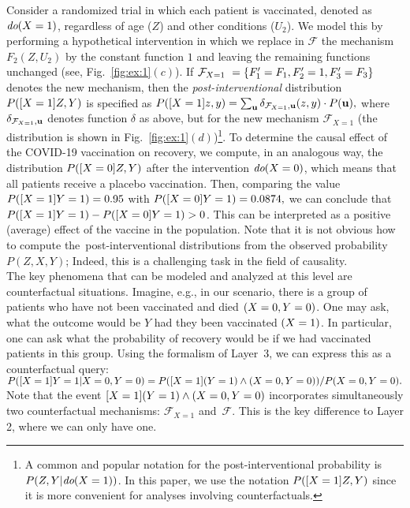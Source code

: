 \documentclass[a4paper,UKenglish,cleveref, autoref, thm-restate]{lipics-v2021}
\newcommand{\compactEquals}[1]{\let\IsInPP=1#1\let\IsInPP=\relax}
\newcommand{\pp}[1]{{P}(\compactEquals{#1})}
\newcommand{\cF}{{\mathcal F}}
\newcommand{\bu}{{\bf u}}
\def\mmid{ | }
\def\dop{\textit{do}}
\begin{document}
 Consider a randomized  trial in which each patient is vaccinated,
denoted as $\compactEquals{\dop(X=1)}$, regardless of age ($Z$) and other conditions ($U_2$). 
We model this by performing a hypothetical intervention in which we replace in $\cF$ 
the mechanism $F_2(Z,U_2)$ by the constant function $1$ and leaving the remaining functions unchanged (see, Fig.~\ref{fig:ex:1}$(c)$).
If $\cF_{X=1} \ =\{\compactEquals{F'_1=F_1,F'_2=1,F'_3=F_3}\}$ 
denotes the new mechanism, then the \emph{post-interventional} 
distribution
$\pp{[X=1]Z,Y}$ is specified as 
$\pp{[X=1]z,y}=\sum_{\bu}\delta_{\cF_{X=1},\bu}(z,y)\cdot P(\bu),$ where 
$\delta_{\cF_{X=1},\bu}$ denotes function $\delta$ as 
above, but for the new 
mechanism $\cF_{X=1}$ (the distribution is shown in Fig.~\ref{fig:ex:1}$(d)$)\footnote{A common and popular notation for the post-interventional probability 
is $\pp{Z,Y\mmid \compactEquals{\dop(X=1)}}$. In this paper,
we use the notation $\pp{[\compactEquals{X=1}]Z,Y}$ since
it is more convenient for analyses involving counterfactuals.}.
To determine the causal effect of the COVID-19 vaccination  on recovery, we 
compute, in an analogous way, the distribution $\pp{[X=0]Z,Y}$ 
after  the intervention $\compactEquals{\dop(X=0)}$, which means that all patients receive a placebo vaccination. 
Then, comparing the value 
$\pp{[X=1]Y=1}=0.95$ with $\pp{[X=0]Y=1}=0.0874,$
we can conclude that $\pp{[X=1]Y=1} - \pp{[X=0]Y=1} >0$. 
This can be
interpreted as a positive  (average) effect of the vaccine in the population. 
Note that it is not obvious how to compute 
the~post-interventional distributions 
from the observed probability $P(Z,X,Y)$; Indeed, this is 
a challenging task in the field of causality. \\


 The key phenomena that can be modeled and analyzed at this level 
are counterfactual situations. Imagine, e.g., in our scenario, there is a group of patients who have not been vaccinated
and died $\compactEquals{(X = 0, Y = 0)}$.
One may ask, what the outcome would be  $Y$ had they been vaccinated
$\compactEquals{(X = 1)}$. In particular,  one can ask what the probability of recovery would be 
if we had vaccinated patients in this group.
Using the formalism of  Layer~3, we can express this as 
a counterfactual query:
$\pp{[X=1]Y=1 \mmid X=0,Y=0}= \pp{[X=1](Y=1) \wedge (X=0,Y=0)} / \pp{X=0, Y=0}.$
Note that  the event $\compactEquals{[X=1](Y=1) \wedge (X=0,Y=0)}$ incorporates 
simultaneously two counterfactual mechanisms: $\cF_{X=1}$ and~$\cF$. 
This is the key difference to Layer 2, where we can only have one.
\end{document}
